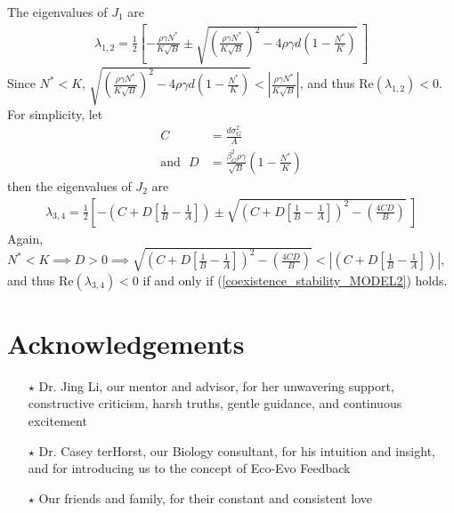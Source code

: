 \documentclass{amsart}
\theoremstyle{definition}
\theoremstyle{remark}
\numberwithin{equation}{section}
\begin{document}
The eigenvalues of $J_1$ are
\begin{align*}
	\lambda_{1,2} = \frac{1}{2}\left[-\frac{\rho\gamma N^*}{K\sqrt{B}} \pm \sqrt{\left(\frac{\rho\gamma N^*}{K\sqrt{B}}\right)^2 - 4\rho\gamma d\left(1 - \frac{N^*}{K}\right)}\ \right]
\end{align*}
Since $N^* < K$, $\sqrt{\left(\frac{\rho\gamma N^*}{K\sqrt{B}}\right)^2 - 4\rho\gamma d\left(1 - \frac{N^*}{K}\right)} < \left|\frac{\rho\gamma N^*}{K\sqrt{B}}\right|$, and thus $\text{Re}(\lambda_{1,2}) < 0$. \\

\noindent For simplicity, let
\begin{align*}
	C &= \frac{d\sigma_G^2}{A} \\
	\text{and} \ \ \ D &= \frac{\beta_G^2\rho\gamma}{\sqrt{B}}\left(1 - \frac{N^*}{K}\right)
\end{align*}
then the eigenvalues of $J_2$ are
\begin{align*}
	\lambda_{3,4} = \frac{1}{2}\left[-\left(C + D\left[\frac{1}{B} - \frac{1}{A} \right]\right) \pm \sqrt{\left(C + D\left[\frac{1}{B} - \frac{1}{A} \right]\right)^2 - \left(\frac{4CD}{B}\right)}\ \right]
\end{align*}
Again, $N^* < K \implies D > 0 \implies \sqrt{\left(C + D\left[\frac{1}{B} - \frac{1}{A} \right]\right)^2 - \left(\frac{4CD}{B}\right)} < \left|\left(C + D\left[\frac{1}{B} - \frac{1}{A} \right]\right)\right|$, and thus $\text{Re}(\lambda_{3,4}) < 0$ if and only if (\ref{coexistence_stability_MODEL2}) holds.
































\FloatBarrier
\pagebreak
\section{Acknowledgements}
\begin{itemize}
	\item[$\star$] Dr. Jing Li, our mentor and advisor, for her unwavering support, constructive criticism, harsh truths, gentle guidance, and continuous excitement
	\item[$\star$] Dr. Casey terHorst, our Biology consultant, for his intuition and insight, and for introducing us to the concept of Eco-Evo Feedback
	\item[$\star$] Our friends and family, for their constant and consistent love
\end{itemize}
\end{document}
